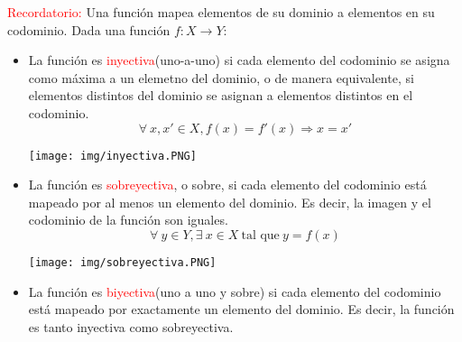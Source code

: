 \documentclass[../main]{subfiles}
\begin{document}
\begin{adjustwidth}{0pt}{-100pt}
\textcolor{red}{Recordatorio:} Una función mapea elementos de su dominio a elementos en su codominio. Dada una función $f: X\rightarrow Y$:
\begin{itemize}
    \item 
    \begin{minipage}{0.7\textwidth}
        La función es \textcolor{red}{inyectiva}(uno-a-uno) si cada elemento del codominio se asigna como máxima a un elemetno del dominio, o de manera equivalente, si elementos distintos del dominio se asignan a elementos distintos en el codominio.
        \begin{equation}
            \forall \ x,x' \in X, f(x)=f'(x) \Rightarrow x=x'
        \end{equation}    
    \end{minipage}
    \begin{minipage}{0.5\textwidth}
    \begin{adjustwidth}{0pt}{0pt}
        \begin{center}
            \texttt{[image: img/inyectiva.PNG]}
        \end{center}
    \end{adjustwidth}
    \end{minipage}
    \item 
    \begin{minipage}{0.7\textwidth}
        La función es \textcolor{red}{sobreyectiva}, o sobre, si cada elemento del codominio está mapeado por al menos un elemento del dominio. Es decir, la imagen y el codominio de la función son iguales.
        \begin{equation}
            \forall \ y \in Y, \exists \ x \in X \ \text{tal que} \ y=f(x)
        \end{equation}   
    \end{minipage}
    \begin{minipage}{0.5\textwidth}
    \begin{adjustwidth}{0pt}{0pt}
        \begin{center}
            \texttt{[image: img/sobreyectiva.PNG]}
        \end{center}
    \end{adjustwidth}
    \end{minipage}
    \item 
    \begin{minipage}{0.7\textwidth}
        La función es \textcolor{red}{biyectiva}(uno a uno y sobre) si cada elemento del codominio está mapeado por exactamente un elemento del dominio. Es decir, la función es tanto inyectiva como sobreyectiva.

\end{minipage}
\end{itemize}
\end{adjustwidth}
\end{document}
